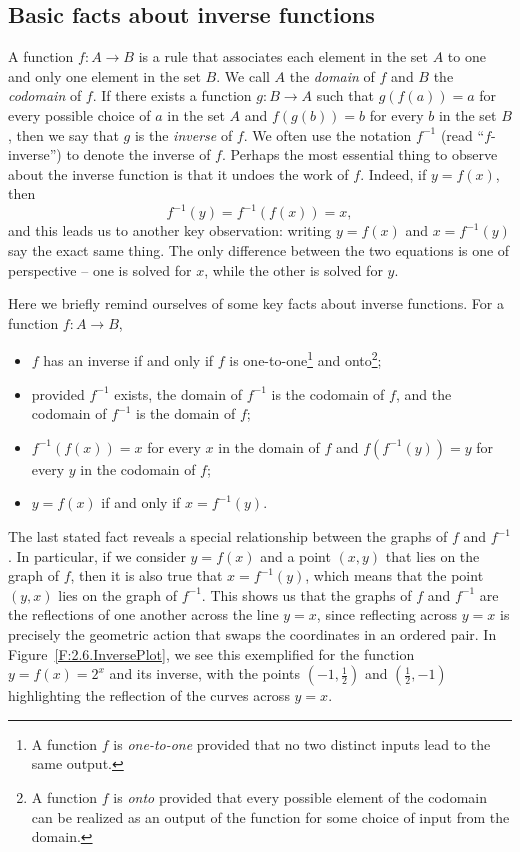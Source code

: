 \subsection*{Basic facts about inverse functions}

A function  $f : A \to B$ is a rule that associates each element in the set $A$ to one and only one element in the set $B$.  We call $A$ the \emph{domain}  of $f$ and $B$ the \emph{codomain} of $f$.  If there exists a function $g : B \to A$ such that $g(f(a)) = a$ for every possible choice of $a$ in the set $A$ and $f(g(b)) = b$ for every $b$ in the set $B$, then we say that $g$ is the \emph{inverse} of $f$.  We often use the notation $f^{-1}$ (read ``$f$-inverse'') to denote the inverse of $f$.  Perhaps the most essential thing to observe about the inverse function is that it undoes the work of $f$.  Indeed, if $y = f(x)$, then
$$f^{-1}(y) = f^{-1}(f(x)) = x,$$
and this leads us to another key observation:  writing $y = f(x)$ and $x = f^{-1}(y)$ say the exact same thing.  The only difference between the two equations is one of perspective -- one is solved for $x$, while the other is solved for $y$.

Here we briefly remind ourselves of some key facts about inverse functions.  For a function $f : A \to B$, 
\begin{itemize}
	\item $f$ has an inverse if and only if $f$ is one-to-one\footnote{A function $f$ is \emph{one-to-one}  provided that no two distinct inputs lead to the same output.} and onto\footnote{A function $f$ is \emph{onto}  provided that every possible element of the codomain can be realized as an output of the function for some choice of input from the domain.};
	\item provided $f^{-1}$ exists, the domain of $f^{-1}$ is the codomain of $f$, and the codomain of $f^{-1}$ is the domain of $f$;
	\item $f^{-1}(f(x)) = x$ for every $x$ in the domain of $f$ and $f(f^{-1}(y)) = y$ for every $y$ in the codomain of $f$;
	\item $y = f(x)$ if and only if $x = f^{-1}(y)$.
\end{itemize}
The last stated fact reveals a special relationship between the graphs of $f$ and $f^{-1}$.  In particular, if we consider $y = f(x)$ and a point $(x,y)$ that lies on the graph of $f$, then it is also true that $x = f^{-1}(y)$, which means that the point $(y,x)$ lies on the graph of $f^{-1}$.  This shows us that the graphs of $f$ and $f^{-1}$ are the reflections of one another across the line $y = x$, since reflecting across $y = x$ is precisely the geometric action that swaps the coordinates in an ordered pair.  In Figure~\ref{F:2.6.InversePlot}, we see this exemplified for the function $y = f(x) = 2^x$ and its inverse, with the points $(-1,\frac{1}{2})$ and $(\frac{1}{2},-1)$ highlighting the reflection of the curves across $y = x$.

